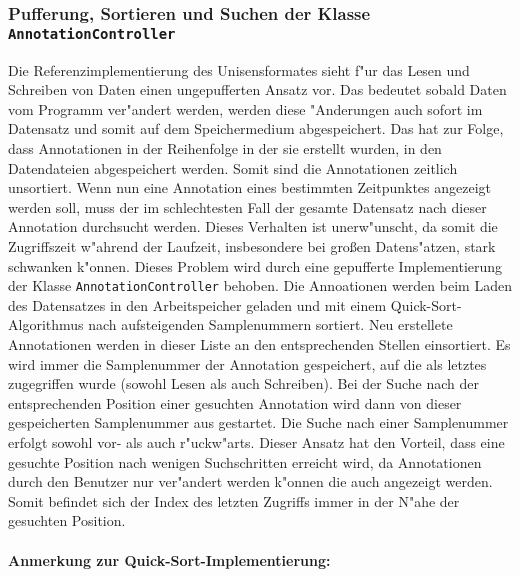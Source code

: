 
\subsubsection{Pufferung, Sortieren und Suchen der Klasse \texttt{AnnotationController}}
\label{sec:anno_ctrl}

Die Referenzimplementierung des Unisensformates sieht f"ur das Lesen und Schreiben von Daten einen ungepufferten Ansatz vor.
Das bedeutet sobald Daten vom Programm ver"andert werden, werden diese "Anderungen auch sofort im Datensatz und somit auf dem Speichermedium abgespeichert.
Das hat zur Folge, dass Annotationen in der Reihenfolge in der sie erstellt wurden, in den Datendateien abgespeichert werden.
Somit sind die Annotationen zeitlich unsortiert.
Wenn nun eine Annotation eines bestimmten Zeitpunktes angezeigt werden soll, muss der im schlechtesten Fall der gesamte Datensatz nach dieser Annotation durchsucht werden.
Dieses Verhalten ist unerw"unscht, da somit die Zugriffszeit w"ahrend der Laufzeit, insbesondere bei gro\ss en Datens"atzen, stark schwanken k"onnen.
Dieses Problem wird durch eine gepufferte Implementierung der Klasse \verb|AnnotationController| behoben.
Die Annoationen werden beim Laden des Datensatzes in den Arbeitspeicher geladen und mit einem Quick-Sort-Algorithmus nach aufsteigenden Samplenummern sortiert.
Neu erstellete Annotationen werden in dieser Liste an den entsprechenden Stellen einsortiert.
Es wird immer die Samplenummer der Annotation gespeichert, auf die als letztes zugegriffen wurde (sowohl Lesen als auch Schreiben).
Bei der Suche nach der entsprechenden Position einer gesuchten Annotation wird dann von dieser gespeicherten Samplenummer aus gestartet.
Die Suche nach einer Samplenummer erfolgt sowohl vor- als auch r"uckw"arts.
Dieser Ansatz hat den Vorteil, dass eine gesuchte Position nach wenigen Suchschritten erreicht wird, da Annotationen durch den Benutzer nur ver"andert werden k"onnen die auch angezeigt werden.
Somit befindet sich der Index des letzten Zugriffs immer in der N"ahe der gesuchten Position.

\paragraph[{Anmerkung zur Quick-Sort-Implementierung}]{Anmerkung zur Quick-Sort-Implementierung:}

